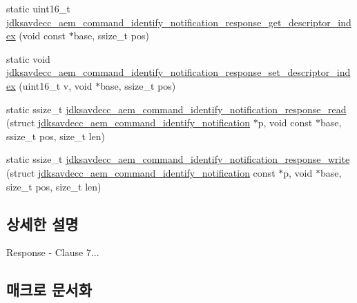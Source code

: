 \begin{DoxyCompactItemize}
\item 
static uint16\+\_\+t \hyperlink{group__command__identify__notification_ga53c6cc6be79c9405e2a26622577ea3ce}{jdksavdecc\+\_\+aem\+\_\+command\+\_\+identify\+\_\+notification\+\_\+response\+\_\+get\+\_\+descriptor\+\_\+index} (void const $\ast$base, ssize\+\_\+t pos)
\item 
static void \hyperlink{group__command__identify__notification_gae158ddbb6da0f18ccaa4a35c13c149bd}{jdksavdecc\+\_\+aem\+\_\+command\+\_\+identify\+\_\+notification\+\_\+response\+\_\+set\+\_\+descriptor\+\_\+index} (uint16\+\_\+t v, void $\ast$base, ssize\+\_\+t pos)
\item 
static ssize\+\_\+t \hyperlink{group__command__identify__notification_ga91fc0f975723f7fdb74fb1ff8e7382e4}{jdksavdecc\+\_\+aem\+\_\+command\+\_\+identify\+\_\+notification\+\_\+response\+\_\+read} (struct \hyperlink{structjdksavdecc__aem__command__identify__notification}{jdksavdecc\+\_\+aem\+\_\+command\+\_\+identify\+\_\+notification} $\ast$p, void const $\ast$base, ssize\+\_\+t pos, size\+\_\+t len)
\item 
static ssize\+\_\+t \hyperlink{group__command__identify__notification_ga02c4ba0d418318baa557e64d753be1fc}{jdksavdecc\+\_\+aem\+\_\+command\+\_\+identify\+\_\+notification\+\_\+response\+\_\+write} (struct \hyperlink{structjdksavdecc__aem__command__identify__notification}{jdksavdecc\+\_\+aem\+\_\+command\+\_\+identify\+\_\+notification} const $\ast$p, void $\ast$base, size\+\_\+t pos, size\+\_\+t len)
\end{DoxyCompactItemize}


\subsection{상세한 설명}
Response -\/ Clause 7... 

\subsection{매크로 문서화}
